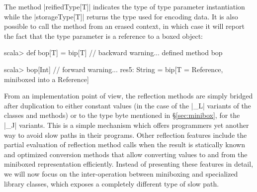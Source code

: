 The method |reifiedType[T]| indicates the type of type parameter instantiation while the |storageType[T]| returns the type used for encoding data. It is also possible to call the method from an erased context, in which case it will report the fact that the type parameter is a reference to a boxed object:

\begin{lstlisting-nobreak}
 scala> def bop[T] = bip[T]
 // backward warning...
 defined method bop

 scala> bop[Int]
 // forward warning...
 res5: String = bip[T = Reference, miniboxed into a Reference]
\end{lstlisting-nobreak}

From an implementation point of view, the reflection methods are simply bridged after duplication to either constant values (in the case of the |_L| variants of the classes and methods) or to the type byte mentioned in \S\ref{sec:minibox}, for the |_J| variants. This is a simple mechanism which offers programmers yet another way to avoid slow paths in their programs.  Other reflection features include the partial evaluation of reflection method calls when the result is statically known and optimized conversion methods that allow converting values to and from the miniboxed representation efficiently. Instead of presenting these features in detail, we will now focus on the inter-operation between miniboxing and specialized library classes, which exposes a completely different type of slow path.
